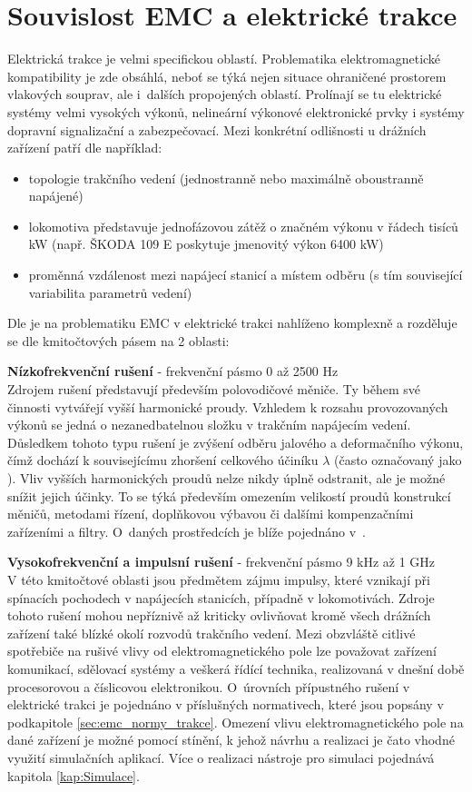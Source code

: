 \section{Souvislost EMC a elektrické trakce} \label{sec:emc_trakce}
Elektrická trakce je velmi specifickou oblastí. Problematika elektromagnetické kompatibility je zde obsáhlá, neboť se týká nejen situace ohraničené prostorem vlakových souprav, ale i~dalších propojených oblastí. Prolínají se tu elektrické systémy velmi vysokých výkonů, nelineární výkonové elektronické prvky i systémy dopravní signalizační a zabezpečovací. Mezi konkrétní odlišnosti u drážních zařízení patří dle \cite{nfr} například:
\begin{itemize}
\item topologie trakčního vedení (jednostranně nebo maximálně oboustranně napájené)
\item lokomotiva představuje jednofázovou zátěž o značném výkonu v řádech tisíců kW (např. ŠKODA 109 E poskytuje jmenovitý výkon 6400 kW)
\item proměnná vzdálenost mezi napájecí stanicí a místem odběru (s tím související variabilita parametrů vedení)
\end{itemize}
Dle \cite{emc_trakce} je na problematiku EMC v elektrické trakci nahlíženo komplexně a rozděluje se dle kmitočtových pásem na 2 oblasti:

\medskip
{\bf Nízkofrekvenční rušení} - frekvenční pásmo 0 až 2500 Hz \\
Zdrojem rušení představují především polovodičové měniče. Ty během své činnosti vytvářejí vyšší harmonické proudy. Vzhledem k rozsahu provozovaných výkonů se jedná o nezanedbatelnou složku v trakčním napájecím vedení. Důsledkem tohoto typu rušení je zvýšení odběru jalového a deformačního výkonu, čímž dochází k souvisejícímu zhoršení celkového účiníku $\lambda$ (často označovaný jako ). Vliv vyšších harmonických proudů nelze nikdy úplně odstranit, ale je možné snížit jejich účinky. To se týká především omezením velikostí proudů konstrukcí měničů, metodami řízení, doplňkovou výbavou či dalšími kompenzačními zařízeními a filtry. O~daných prostředcích je blíže pojednáno v~\cite{nfr}.

\medskip
{\bf Vysokofrekvenční a impulsní rušení} - frekvenční pásmo 9 kHz až 1 GHz \\
V této kmitočtové oblasti jsou předmětem zájmu impulsy, které vznikají při spínacích pochodech v napájecích stanicích, případně v lokomotivách. Zdroje tohoto rušení mohou nepříznivě až kriticky ovlivňovat kromě všech drážních zařízení také blízké okolí rozvodů trakčního vedení. Mezi obzvláště citlivé spotřebiče na rušivé vlivy od elektromagnetického pole lze považovat zařízení komunikací, sdělovací systémy a veškerá řídící technika, realizovaná v dnešní době procesorovou a číslicovou elektronikou. O~úrovních přípustného rušení v elektrické trakci je pojednáno v příslušných normativech, které jsou popsány v podkapitole \ref{sec:emc_normy_trakce}. Omezení vlivu elektromagnetického pole na dané zařízení je možné pomocí stínění, k jehož návrhu a realizaci je čato vhodné využití simulačních aplikací. Více o realizaci nástroje pro simulaci pojednává kapitola \ref{kap:Simulace}.
\newpage

